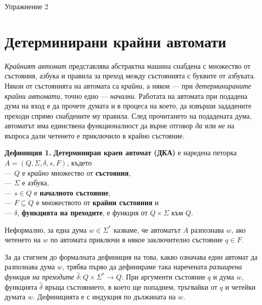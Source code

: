\documentclass{article}
\begin{document}
\begin{center}
    {\huge Упражнение 2}
\end{center}

\vspace{15pt}

\section{Детерминирани крайни автомати}
    \textit{Крайният автомат} представлява абстрактна машина снабдена с множество от състояния, азбука и правила за преход между състоянията с буквите от азбуката.
    Някои от състоянията на автомата са \textit{крайни}, а някои — при \textit{детерминираните крайни автомати}, точно едно — \textit{начални}. 
    Работата на автомата при подадена дума на вход е да прочете думата и в процеса на което, да извърши зададените преходи спрямо снабдените му правила. След
    прочитането на подадената дума, автоматът има единствена функционалност да върне отговор \textit{да} или \textit{не} на въпроса дали четенето е приключило в 
    крайно състояние.
    
    \vspace{15pt}

    \textbf{Дефиниция 1.} \textbf{Детерминиран краен автомат (ДКА)} е наредена петорка $A = (Q, \Sigma, \delta, s, F)$, където \\
    — $Q$ е \textit{крайно} множество от \textbf{състояния}, \\
    — $\Sigma$ е азбука, \\
    — $s \in Q$ е \textbf{началното състояние}, \\
    — $F \subseteq Q$ е множеството от \textbf{крайни състояния} и \\
    — $\delta$, \textbf{функцията на преходите}, е функция от $Q \times \Sigma$ към $Q$.

    \vspace{5pt}
    Неформално, за една дума $w \in \Sigma^*$ казваме, че автоматът $A$ разпознава $w$, ако четенето на $w$ по автомата приключи в някое заключително
    състояние $q \in F$.

    \vspace{5pt}

    За да стигнем до формалната дефиниция на това, какво означава един автомат да разпознава дума $w$,
    трябва първо да дефинираме така наречената \textit{разширена функция на преходите} $\hat{\delta}:Q \times \Sigma^* \rightarrow Q$. 
    При аргументи състояние $q$ и дума $w$, функцията $\hat{\delta}$ връща състоянието, в което ще попаднем,
    тръгвайки от $q$ и четейки думата $w$. Дефиницията е с индукция по дължината на $w$.
\end{document}
